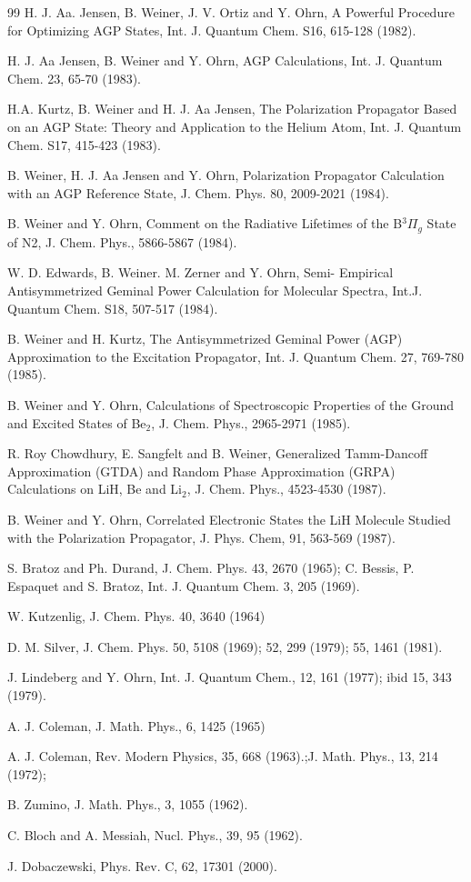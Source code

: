 \documentclass[aps,preprint]{revtex4}
\begin{document}
\begin{thebibliography}{99}
\bibitem{} H. J. Aa. Jensen, B. Weiner, J. V. Ortiz and Y. Ohrn, A Powerful
Procedure for Optimizing AGP States, Int. J. Quantum Chem. S16, 615-128
(1982).

 H. J. Aa Jensen, B. Weiner and Y. Ohrn, AGP Calculations,
Int. J. Quantum Chem. 23, 65-70 (1983).

 H.A. Kurtz, B. Weiner and H. J. Aa Jensen, The Polarization
Propagator Based on an AGP State: Theory and Application to the Helium Atom,
Int. J. Quantum Chem. S17, 415-423 (1983).

 B. Weiner, H. J. Aa Jensen and Y. Ohrn, Polarization
Propagator Calculation with an AGP Reference State, J. Chem. Phys. 80,
2009-2021 (1984).

 B. Weiner and Y. Ohrn, Comment on the Radiative Lifetimes
of the B$^{3}\Pi _{g}$ State of N2, J. Chem. Phys., 5866-5867 (1984).

 W. D. Edwards, B. Weiner. M. Zerner and Y. Ohrn, Semi-
Empirical Antisymmetrized Geminal Power Calculation for Molecular Spectra,
Int.J. Quantum Chem. S18, 507-517 (1984).

 B. Weiner and H. Kurtz, The Antisymmetrized Geminal Power
(AGP) Approximation to the Excitation Propagator, Int. J. Quantum Chem. 27,
769-780 (1985).

 B. Weiner and Y. Ohrn, Calculations of Spectroscopic
Properties of the Ground and Excited States of Be$_{2}$, J. Chem. Phys.,
2965-2971 (1985).

 R. Roy Chowdhury, E. Sangfelt and B. Weiner,
Generalized Tamm-Dancoff Approximation (GTDA) and Random Phase Approximation
(GRPA) Calculations on LiH, Be and Li$_{2}$, J. Chem. Phys., 4523-4530
(1987).

 B. Weiner and Y. Ohrn, Correlated Electronic States the
LiH Molecule Studied with the Polarization Propagator, J. Phys. Chem, 91,
563-569 (1987).

 S. Bratoz and Ph. Durand, J. Chem. Phys. 43, 2670 (1965);
C. Bessis, P. Espaquet and S. Bratoz, Int. J. Quantum Chem. 3, 205 (1969).

 W. Kutzenlig, J. Chem. Phys. 40, 3640 (1964)

 D. M. Silver, J. Chem. Phys. 50, 5108 (1969); 52, 299
(1979); 55, 1461 (1981).

 J. Lindeberg and Y. Ohrn, Int. J. Quantum Chem., 12,
161 (1977); ibid 15, 343 (1979).

 A. J. Coleman, J. Math. Phys., 6, 1425 (1965)

 A. J. Coleman, Rev. Modern Physics, 35, 668 (1963).;J.
Math. Phys., 13, 214 (1972);

 B. Zumino, J. Math. Phys., 3, 1055 (1962).

 C. Bloch and A. Messiah, Nucl. Phys., 39, 95 (1962).

 J. Dobaczewski, Phys. Rev. C, 62, 17301 (2000).

\end{thebibliography}
\end{document}
